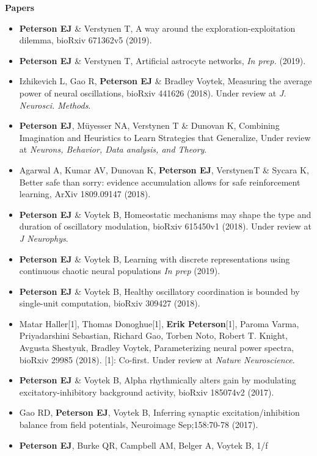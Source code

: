 \textbf{Papers}

\begin{itemize}
\item
  \textbf{Peterson EJ} \& Verstynen T, A way around the
  exploration-exploitation dilemma, bioRxiv 671362v5 (2019).
\item
  \textbf{Peterson EJ} \& Verstynen T, Artificial astrocyte networks,
  \emph{In prep.} (2019).
\item
  Izhikevich L, Gao R, \textbf{Peterson EJ} \& Bradley Voytek, Measuring
  the average power of neural oscillations, bioRxiv 441626 (2018). Under
  review at \emph{J. Neurosci. Methods}.
\item
  \textbf{Peterson EJ}, Müyesser NA, Verstynen T \& Dunovan K, Combining
  Imagination and Heuristics to Learn Strategies that Generalize, Under
  review at \emph{Neurons, Behavior, Data analysis, and Theory}.
\item
  Agarwal A, Kumar AV, Dunovan K, \textbf{Peterson EJ}, VerstynenT \&
  Sycara K, Better safe than sorry: evidence accumulation allows for
  safe reinforcement learning, ArXiv 1809.09147 (2018).
\item
  \textbf{Peterson EJ} \& Voytek B, Homeostatic mechanisms may shape the
  type and duration of oscillatory modulation, bioRxiv 615450v1 (2018).
  Under review at \emph{J Neurophys}.
\item
  \textbf{Peterson EJ} \& Voytek B, Learning with discrete
  representations using continuous chaotic neural populations \emph{In
  prep} (2019).
\item
  \textbf{Peterson EJ} \& Voytek B, Healthy oscillatory coordination is
  bounded by single-unit computation, bioRxiv 309427 (2018).
\item
  Matar Haller{[}1{]}, Thomas Donoghue{[}1{]}, \textbf{Erik
  Peterson}{[}1{]}, Paroma Varma, Priyadarshini Sebastian, Richard Gao,
  Torben Noto, Robert T. Knight, Avgusta Shestyuk, Bradley Voytek,
  Parameterizing neural power spectra, bioRxiv 29985 (2018). {[}1{]}:
  Co-first. Under review at \emph{Nature Neuroscience}.
\item
  \textbf{Peterson EJ} \& Voytek B, Alpha rhythmically alters gain by
  modulating excitatory-inhibitory background activity, bioRxiv 185074v2
  (2017).
\item
  Gao RD, \textbf{Peterson EJ}, Voytek B, Inferring synaptic
  excitation/inhibition balance from field potentials, Neuroimage
  Sep;158:70-78 (2017).
\item
  \textbf{Peterson EJ}, Burke QR, Campbell AM, Belger A, Voytek B, 1/f

\end{itemize}
